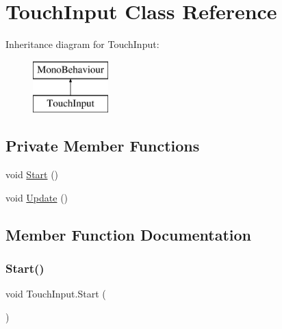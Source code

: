\hypertarget{class_touch_input}{}\section{Touch\+Input Class Reference}
\label{class_touch_input}
Inheritance diagram for Touch\+Input\+:\begin{figure}[H]
\begin{center}
\leavevmode
\includegraphics[height=2.000000cm]{class_touch_input}
\end{center}
\end{figure}
\subsection*{Private Member Functions}
\begin{DoxyCompactItemize}
\item 
void \hyperlink{class_touch_input_a66648591e7b990dff543e5dca46c5784}{Start} ()
\item 
void \hyperlink{class_touch_input_a5d0947600e2d12b72c8e76e67c9ceeca}{Update} ()
\end{DoxyCompactItemize}


\subsection{Member Function Documentation}
\mbox{\label{class_touch_input_a66648591e7b990dff543e5dca46c5784}} 
\subsubsection{\texorpdfstring{Start()}{Start()}}
{\footnotesize\ttfamily void Touch\+Input.\+Start (\begin{DoxyParamCaption}{ }\end{DoxyParamCaption})\hspace{0.3cm}{\ttfamily [private]}}

\mbox{\label{class_touch_input_a5d0947600e2d12b72c8e76e67c9ceeca}} 
